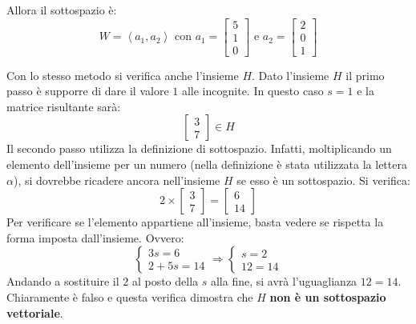 \documentclass[a4paper]{article}
\begin{document}
	Allora il sottospazio è:
	\begin{equation*}
		W = \left\langle a_{1}, a_{2} \right\rangle \text{ con } a_{1} = \begin{bmatrix}
			5 \\
			1 \\
			0
		\end{bmatrix} \text{ e } a_{2} = \begin{bmatrix}
			2 \\
			0 \\
			1
		\end{bmatrix}
	\end{equation*}
	
	\noindent
	Con lo stesso metodo si verifica anche l'insieme $H$. Dato l'insieme $H$ il \textcolor{Red3}{primo passo} è supporre di dare il valore $1$ alle incognite. In questo caso $s = 1$ e la matrice risultante sarà:
	\begin{equation*}
		\begin{bmatrix}
			3 \\
			7
		\end{bmatrix} \in H
	\end{equation*}
	Il \textcolor{Red3}{secondo passo} utilizza la definizione di sottospazio. Infatti, moltiplicando un elemento dell'insieme per un numero (nella definizione è stata utilizzata la lettera $\alpha$), si dovrebbe ricadere ancora nell'insieme $H$ se esso è un sottospazio. Si verifica:
	\begin{equation*}
		2 \times \begin{bmatrix}
			3 \\
			7
		\end{bmatrix} =
		\begin{bmatrix}
			6 \\
			14
		\end{bmatrix}
	\end{equation*}
	Per verificare se l'elemento appartiene all'insieme, basta vedere se rispetta la forma imposta dall'insieme. Ovvero:
	\begin{equation*}
		\begin{cases}
			3s = 6 \\
			2 + 5s = 14
		\end{cases} \Longrightarrow
		\begin{cases}
			s = 2 \\
			12 = 14
		\end{cases}
	\end{equation*}
	Andando a sostituire il $2$ al posto della $s$ alla fine, si avrà l'uguaglianza $12=14$. Chiaramente è falso e questa verifica dimostra che $H$ \textbf{non è un sottospazio vettoriale}.\newpage
	
\end{document}

